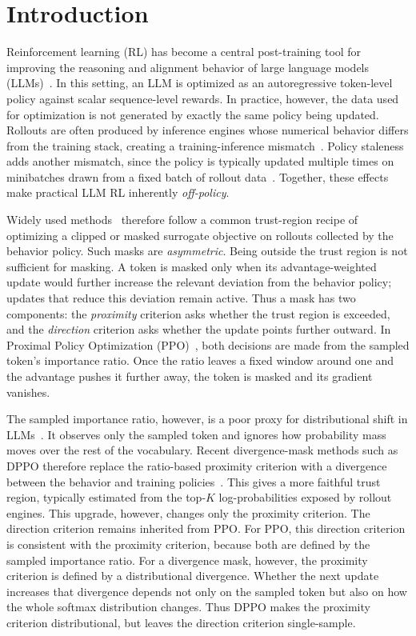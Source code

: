 \section{Introduction}
\label{sec:intro}

Reinforcement learning (RL) has become a central post-training tool for improving
the reasoning and alignment behavior of large language models
(LLMs)~\citep{ouyang2022training,guo2025deepseekr1,grpo}. 
In this setting, an LLM is optimized as an autoregressive token-level policy
against scalar sequence-level rewards.
In practice, however, the data used for optimization is not generated by exactly
the same policy being updated.
Rollouts are often produced by inference engines whose numerical behavior differs
from the training stack, creating a training-inference mismatch~\citep{qi2025defeating,yao2025offpolicy}.
Policy staleness adds another mismatch, since the policy is typically updated multiple
times on minibatches drawn from a fixed batch of rollout data~\citep{zheng2025stabilizing}.
Together, these effects make practical LLM RL inherently \emph{off-policy}.

Widely used methods~\citep{ppo,grpo,yu2025dapo,cispo,drgrpo} therefore follow a
common trust-region recipe of optimizing a clipped or masked surrogate objective
on rollouts collected by the behavior policy.
Such masks are \emph{asymmetric}.
Being outside the trust region is not sufficient for masking.
A token is masked only when its advantage-weighted update would further increase
the relevant deviation from the behavior policy; updates that reduce this
deviation remain active.
Thus a mask has two components:
the \emph{proximity} criterion asks whether the trust region is exceeded, and
the \emph{direction} criterion asks whether the update points further outward.
In Proximal Policy Optimization (PPO)~\citep{ppo}, both decisions are made from
the sampled token's importance ratio.
Once the ratio leaves a fixed window around one and the advantage pushes it
further away, the token is masked and its gradient vanishes.

The sampled importance ratio, however, is a poor proxy for distributional shift
in LLMs~\citep{dppo}.
It observes only the sampled token and ignores how probability mass moves over
the rest of the vocabulary.
Recent divergence-mask methods such as DPPO therefore replace the ratio-based
proximity criterion with a divergence between the behavior and training
policies~\citep{dppo}.
This gives a more faithful trust region, typically estimated from the top-$K$
log-probabilities exposed by rollout engines.
This upgrade, however, changes only the proximity criterion.
The direction criterion remains inherited from PPO.
For PPO, this direction criterion is consistent with the proximity criterion,
because both are defined by the sampled importance ratio.
For a divergence mask, however, the proximity criterion is defined by a
distributional divergence.
Whether the next update increases that divergence depends not only on the
sampled token but also on how the whole softmax distribution changes.
Thus DPPO makes the proximity criterion distributional, but leaves the direction
criterion single-sample.


